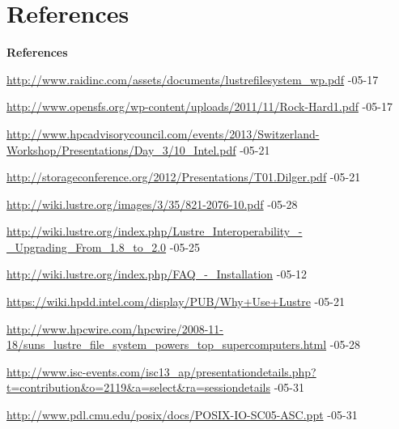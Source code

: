 \section{References}

\begin{frame}{\textbf{References}}
    \tiny
    \begin{thebibliography}{1}
        \beamertemplatetextbibitems

            \url{http://www.raidinc.com/assets/documents/lustrefilesystem_wp.pdf} -05-17

            \url{http://www.opensfs.org/wp-content/uploads/2011/11/Rock-Hard1.pdf} -05-17

            \url{http://www.hpcadvisorycouncil.com/events/2013/Switzerland-Workshop/Presentations/Day_3/10_Intel.pdf} -05-21

            \url{http://storageconference.org/2012/Presentations/T01.Dilger.pdf} -05-21

            \url{http://wiki.lustre.org/images/3/35/821-2076-10.pdf} -05-28

            \url{http://wiki.lustre.org/index.php/Lustre_Interoperability_-_Upgrading_From_1.8_to_2.0} -05-25

            \url{http://wiki.lustre.org/index.php/FAQ_-_Installation} -05-12

            \url{https://wiki.hpdd.intel.com/display/PUB/Why+Use+Lustre} -05-21

            \url{http://www.hpcwire.com/hpcwire/2008-11-18/suns_lustre_file_system_powers_top_supercomputers.html} -05-28

            \url{http://www.isc-events.com/isc13_ap/presentationdetails.php?t=contribution&o=2119&a=select&ra=sessiondetails} -05-31

            \url{http://www.pdl.cmu.edu/posix/docs/POSIX-IO-SC05-ASC.ppt} -05-31

    \end{thebibliography}
\end{frame}
